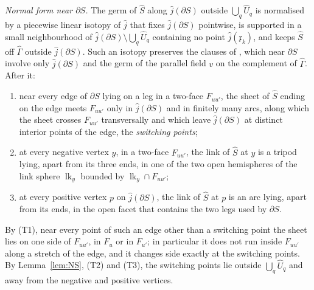 \emph{Normal form near $\partial S$.} The germ of $\hat S$ along $\hat j(\partial S)$ outside $\bigcup_q\widehat U_q$ is
normalised by a piecewise linear isotopy of $\hat j$ that fixes $\hat j(\partial S)$ pointwise, is supported in
a small neighbourhood of $\hat j(\partial S)\setminus\bigcup_q\widehat U_q$ containing no point $\hat j(\mathfrak x_k)$, and
keeps $\hat S$ off $\widehat\Gamma$ outside $\hat j(\partial S)$. Such an isotopy preserves the clauses of
\cite[Def.~7.2]{CBM}, which near $\partial S$ involve only $\hat j(\partial S)$ and the germ of the parallel field $v$ on the
complement of $\widehat\Gamma$. After it:
\begin{enumerate}
\item[(T1)] near every edge of $\partial S$ lying on a leg in a two-face $F_{uu'}$, the sheet of $\hat S$ ending on the edge meets
$F_{uu'}$ only in $\hat j(\partial S)$ and in finitely many arcs, along which the sheet crosses $F_{uu'}$ transversally and which
leave $\hat j(\partial S)$ at distinct interior points of the edge, the \emph{switching points};
\item[(T2)] at every negative vertex $y$, in a two-face $F_{uu'}$, the link of $\hat S$ at $y$ is a tripod lying, apart from its
three ends, in one of the two open hemispheres of the link sphere $\operatorname{lk}_y$ bounded by
$\operatorname{lk}_y\cap F_{uu'}$;
\item[(T3)] at every positive vertex $p$ on $\hat j(\partial S)$, the link of $\hat S$ at $p$ is an arc lying, apart from its
ends, in the open facet that contains the two legs used by $\partial S$.
\end{enumerate}
By (T1), near every point of such an edge other than a switching point the sheet lies on one side of $F_{uu'}$, in $F_u$ or in
$F_{u'}$; in particular it does not run inside $F_{uu'}$ along a stretch of the edge, and it changes side exactly at the
switching points. By Lemma~\ref{lem:NS}, (T2) and (T3), the switching points lie outside $\bigcup_q\widehat U_q$ and away from
the negative and positive vertices.

